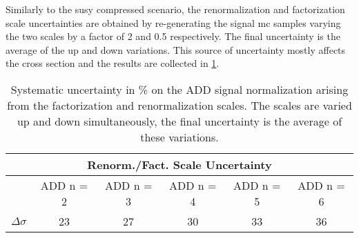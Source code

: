 Similarly to the \gls{susy} compressed scenario, the renormalization and
factorization scale uncertainties are obtained by re-generating the signal
\gls{mc} samples varying the two scales by a factor of 2 and 0.5
respectively. The final uncertainty is the average of the up and down
variations. This source of uncertainty mostly affects the cross section and the
results are collected in \cref{tab:add_fact_ren_scale}.
\begin{table}[!ht]
  \centering
  \begin{tabular}{lccccc}
    \toprule
    \multicolumn{6}{c}{Renorm./Fact. Scale Uncertainty} \\
    \midrule \midrule
    \quad & ADD n = 2 & ADD n = 3 & ADD n = 4 & ADD n = 5 & ADD n = 6 \\
    \midrule
    $\Delta \sigma$ & 23 & 27 & 30 & 33 & 36 \\
    \bottomrule
  \end{tabular}
  \caption{Systematic uncertainty in \% on the ADD signal normalization arising from
    the factorization and renormalization scales. The scales are varied up and
    down simultaneously, the final uncertainty is the average of these
    variations.}
  \label{tab:add_fact_ren_scale}
\end{table}
